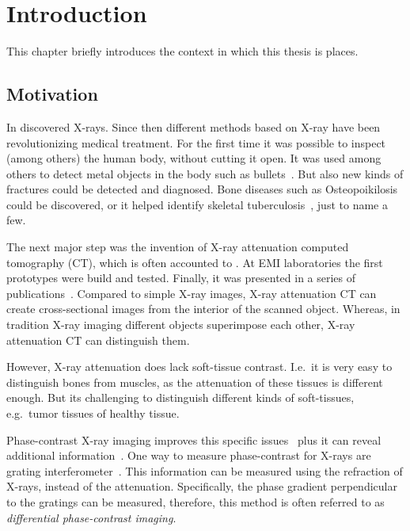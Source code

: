 \chapter{Introduction}\label{chap:introduction}

This chapter briefly introduces the context in which this thesis is places.

\section{Motivation}\label{chap:Motivation}

In \citeyear{rontgen_uber_1895} \citeauthor{rontgen_uber_1895} discovered X-rays. Since then
different methods based on X-ray have been revolutionizing medical treatment. For the first time it
was possible to inspect (among others) the human body, without cutting it open. It was used among
others to detect metal objects in the body such as bullets~\cite{haygood_skeletal_1996}. But also
new kinds of fractures could be detected and diagnosed. Bone diseases such as Osteopoikilosis could
be discovered, or it helped identify skeletal tuberculosis~\cite{haygood_skeletal_1996}, just to
name a few.

The next major step was the invention of X-ray attenuation computed tomography (CT), which is often
accounted to \citeauthor{hounsfield_computerized_1973}. At EMI laboratories the first prototypes
were build and tested. Finally, it was presented in a series of
publications~\cite{hounsfield_computerized_1973,ambrose_computerized_1973, perry_computerized_1973}.
Compared to simple X-ray images, X-ray attenuation CT can create cross-sectional images from the
interior of the scanned object. Whereas, in tradition X-ray imaging different objects superimpose
each other, X-ray attenuation CT can distinguish them.

However, X-ray attenuation does lack soft-tissue contrast. I.e.\ it is very easy to distinguish
bones from muscles, as the attenuation of these tissues is different enough. But its challenging to
distinguish different kinds of soft-tissues, e.g.\ tumor tissues of healthy tissue.

Phase-contrast X-ray imaging improves this specific issues~\cite{lewis_medical_2004} plus it can
reveal additional information~\cite{hahn_numerical_2012}. One way to measure phase-contrast for
X-rays are grating interferometer~\cite{pfeiffer_hard-x-ray_2008}. This information can be measured
using the refraction of X-rays, instead of the attenuation. Specifically, the phase gradient
perpendicular to the gratings can be measured, therefore, this method is often referred to as
\textit{differential phase-contrast imaging}.

